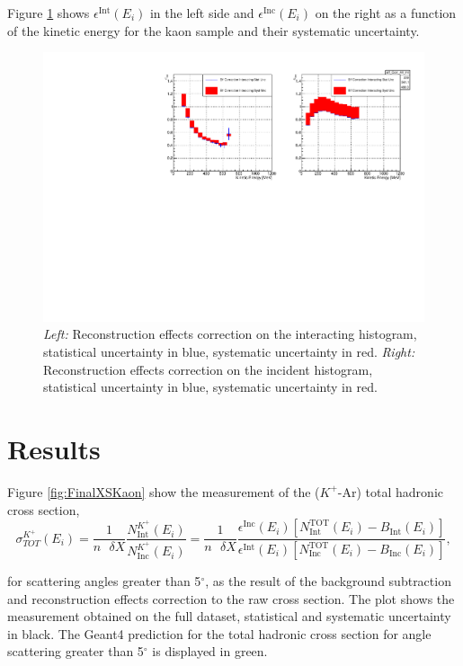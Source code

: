 Figure \ref{fig:EffCorrK} shows $\epsilon^{\text{Int}}(E_{i})$ in the left side and $ \epsilon^{\text{Inc}}(E_i)$ on the right as a function of the kinetic energy for the kaon sample and their systematic uncertainty. 


\begin{figure}
\centering
\includegraphics[width=\textwidth]{Chapter-7/Images/EffCorrK.pdf}
\caption{\emph{Left:} Reconstruction  effects correction on the interacting histogram, statistical uncertainty in blue, systematic uncertainty in red. \emph{Right:}  Reconstruction  effects  correction on the incident histogram, statistical uncertainty in blue, systematic uncertainty in red.}
\label{fig:EffCorrK}
\end{figure}



\section{Results}\label{ch:FinalKaon}
Figure \ref{fig:FinalXSKaon} show the measurement of the ($K^+$-Ar) total hadronic cross section,
\begin{equation}
 \sigma^{K^+}_{TOT}(E_{i})  =\frac{1}{n\text{ } \delta X}\frac{N^{K^+}_{ \text{Int}} (E_{i})}{N^{K^+}_{ \text{Inc}}(E_{i})} = \frac{1}{n \text{ }\delta X}\frac{ \epsilon^{\text{Inc}}(E_i) [ N^{ \text{TOT}}_{ \text{Int}} (E_{i}) - B_{ \text{Int}} (E_i)] }{   \epsilon^{\text{Int}}(E_i) [N^{ \text{TOT}}_{ \text{Inc}}(E_{i}) - B_{ \text{Inc}} (E_i)]},
\end{equation}

for  scattering angles greater than 5$^\circ$, as the result of the background subtraction and reconstruction  effects  correction to the raw cross section. The plot shows the measurement obtained on the full dataset, statistical and systematic uncertainty in black. The Geant4 prediction for the total hadronic cross section for angle scattering greater than 5$^\circ$ is displayed in green.

